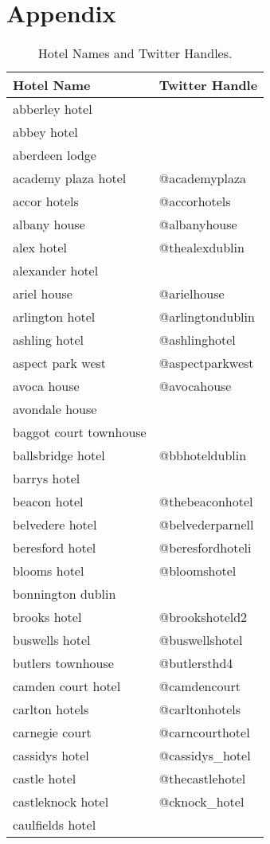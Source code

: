 \chapter{Appendix}

\begin{table}[h!]
\caption{Hotel Names and Twitter Handles.}
\label{Table:hotels}
\begin{tabular}{|p{7cm}|p{5cm}|}
\hline
\rowcolor[HTML]{EFEFEF}
\textbf{Hotel Name} & \textbf{Twitter Handle} \\ \hline
abberley hotel &  \\ \hline
abbey hotel &  \\ \hline
aberdeen lodge &  \\ \hline
academy plaza hotel & @academyplaza \\ \hline
accor hotels & @accorhotels \\ \hline
albany house & @albanyhouse \\ \hline
alex hotel & @thealexdublin \\ \hline
alexander hotel &  \\ \hline
ariel house & @arielhouse \\ \hline
arlington hotel & @arlingtondublin \\ \hline
ashling hotel & @ashlinghotel \\ \hline
aspect park west & @aspectparkwest \\ \hline
avoca house & @avocahouse \\ \hline
avondale house &  \\ \hline
baggot court townhouse &  \\ \hline
ballsbridge hotel & @bbhoteldublin \\ \hline
barrys hotel &  \\ \hline
beacon hotel & @thebeaconhotel \\ \hline
belvedere hotel & @belvederparnell \\ \hline
beresford hotel & @beresfordhoteli \\ \hline
blooms hotel & @bloomshotel \\ \hline
bonnington dublin &  \\ \hline
brooks hotel & @brookshoteld2 \\ \hline
buswells hotel & @buswellshotel \\ \hline
butlers townhouse & @butlersthd4 \\ \hline
camden court hotel & @camdencourt \\ \hline
carlton hotels & @carltonhotels \\ \hline
carnegie court & @carncourthotel \\ \hline
cassidys hotel & @cassidys\_hotel \\ \hline
castle hotel & @thecastlehotel \\ \hline
castleknock hotel & @cknock\_hotel \\ \hline
caulfields hotel &  \\ \hline
\end{tabular}
\end{table}


